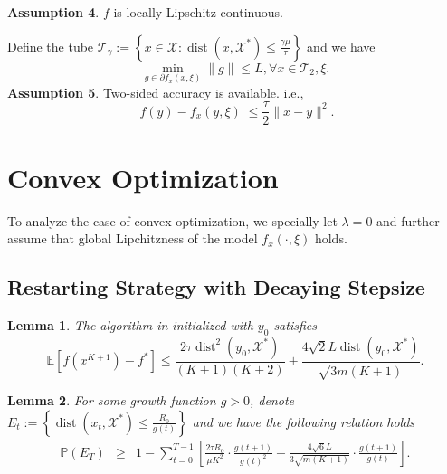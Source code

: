 \documentclass{article}
\newcommand{\assign}{:=}
\newcommand{\cdummy}{\cdot}
\newcommand{\tmop}[1]{\ensuremath{\operatorname{#1}}}
\newcommand{\tmstrong}[1]{\textbf{#1}}
\newtheorem{lemma}{Lemma}
{\theorembodyfont{\rmfamily}\newtheorem{remark}{Remark}}
\begin{document}
{\tmstrong{Assumption 4}}. $f$ is locally Lipschitz-continuous.

Define the tube $\mathcal{T}_{\gamma} \assign \left\{ x \in \mathcal{X}:
\tmop{dist} (x, \mathcal{X}^{\ast}) \leq \frac{\gamma \mu}{\tau} \right\}$ and
we have
\[ \min_{g \in \partial f_x (x, \xi)} \| g \| \leq L, \forall x \in
   \mathcal{T}_2, \xi . \]
{\tmstrong{Assumption 5}}. Two-sided accuracy is available. i.e.,
\[ | f (y) - f_x (y, \xi) | \leq \frac{\tau}{2} \| x - y \|^2 . \]


\section{Convex Optimization}

To analyze the case of convex optimization, we specially let $\lambda = 0$ and
further assume that global Lipchitzness of the model $f_x (\cdummy, \xi)$
holds.

\subsection{Restarting Strategy with Decaying Stepsize}

\begin{lemma}
  The algorithm in \cite{deng2021minibatch} initialized with $y_0$ satisfies
  \[ \mathbb{E} [f (x^{K + 1}) - f^{\ast}] \leq \frac{2 \tau \tmop{dist}^2
     (y_0, \mathcal{X}^{\ast})}{ (K + 1) (K + 2)} + \frac{4 \sqrt{2} L
     \tmop{dist} (y_0, \mathcal{X}^{\ast})}{\sqrt{3 m (K + 1)}} . \]
\end{lemma}

\begin{lemma}
  For some growth function $g > 0$, denote $E_t \assign \left\{ \tmop{dist}
  (x_t, \mathcal{X}^{\ast}) \leq \frac{R_0}{g (t)} \right\}$ and we have the
  following relation holds
  \begin{eqnarray*}
    \mathbb{P} (E_T) & \geq & 1 - \sum_{t = 0}^{T - 1} \left[ \frac{2 \tau
    R_0}{\mu K^2} \cdummy \frac{g (t + 1)}{g (t)^2} + \frac{4 \sqrt{6} L}{3
    \sqrt{m (K + 1)}} \cdummy \frac{g (t + 1)}{g (t)} \right] .
  \end{eqnarray*}
\end{lemma}
\end{document}
